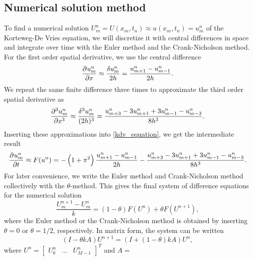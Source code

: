 \subsection{Numerical solution method}

\iffalse
\begin{equation*}
	\dpd{u}{t} = F\left(\dpd{u}{x}, \dpd[3]{u}{x}\right), \qquad \text{where} \,\, F\left(\dpd{u}{x}, \dpd[3]{u}{x}\right) = -\left(1+\pi^2\right) \dpd{u}{x} - \dpd[3]{u}{x}
\end{equation*}
\fi

To find a numerical solution $U_m^n = U(x_m, t_n) \approx u(x_m, t_n) = u_m^n$ of the Korteweg-De Vries equation, we will discretize it with central differences in space and integrate over time with the Euler method and the Crank-Nicholson method.
For the first order spatial derivative, we use the central difference
\begin{equation*}
	\dpd{u_m^n}{x}    \approx \frac{\delta u_m^n}{2 h}       = \frac{u_{m+1}^n-u_{m-1}^n}{2 h}.
\end{equation*}
We repeat the same finite difference three times to approximate the third order spatial derivative as 
\begin{equation*}
	\dpd[3]{u_m^n}{x} \approx \frac{\delta^3 u_m^n}{(2 h)^3} = \frac{u_{m+3}^n-3u_{m+1}^n+3u_{m-1}^n-u_{m-3}^n}{8 h^3}.
\end{equation*}
Inserting these approximations into \cref{kdv_equation}, we get the intermediate result
\begin{equation*}
	\dpd{u_m^n}{t} \approx F(u^n) = -\left(1+\pi^2\right) \frac{u_{m+1}^n-u_{m-1}^n}{2 h} - \frac{u_{m+3}^n-3u_{m+1}^n+3u_{m-1}^n-u_{m-3}^n}{8 h^3}.
\end{equation*}
For later convenience, we write the Euler method and Crank-Nicholson method collectively with the $\theta$-method.
This gives the final system of difference equations for the numerical solution
\begin{equation}\label{theta_method_discretized}
	\frac{U_m^{n+1} - U_m^n}{k} = (1-\theta) F(U^n) + \theta F(U^{n+1}),
\end{equation}
where the Euler method or the Crank-Nicholson method is obtained by inserting $\theta = 0$ or $\theta = 1/2$, respectively.
In matrix form, the system can be written
\begin{equation}
	\left(I - \theta k A\right) U^{n+1} = \left(I + \left(1-\theta\right) k A\right) U^n,
	\label{matrixeq}
\end{equation}
where $U^{n} = \begin{bmatrix} U_0^n & \dots & U_{M-1}^n \end{bmatrix}^T$ and $A = $
